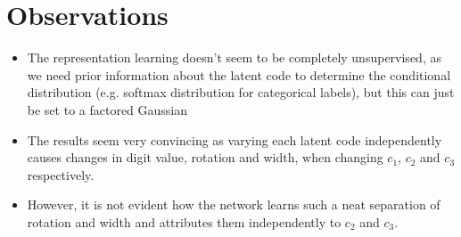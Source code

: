 \documentclass[12pt]{article}
\begin{document}
\section{Observations}
  \begin{itemize}
    \item The representation learning doesn't seem to be completely unsupervised, as we need prior information about the latent code to determine the conditional distribution (e.g. softmax distribution for categorical labels), but this can just be set to a factored Gaussian
    \item The results seem very convincing as varying each latent code independently causes changes in digit value, rotation and width, when changing $c_1$, $c_2$ and $c_3$ respectively.
    \item However, it is not evident how the network learns such a neat separation of rotation and width and attributes them independently to $c_2$ and $c_3$.
  \end{itemize}



\end{document}
